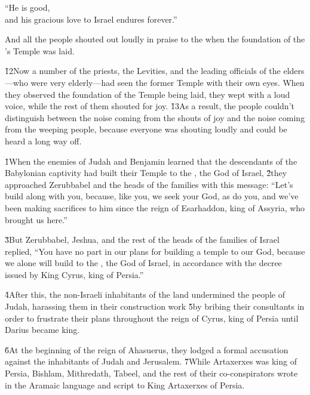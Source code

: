 \begin{poetry}
\poeml ``He is good, \\
\poemll    and his gracious love to Israel endures forever.''
\end{poetry}

And all the people shouted out loudly in praise to the  when the foundation of the 's Temple was laid.

\v{12}Now a number of the priests, the Levities, and the leading officials of the elders---who were very elderly---had seen the former Temple with their own eyes. When they observed the foundation of the Temple being laid, they wept with a loud voice, while the rest of them shouted for joy. \v{13}As a result, the people couldn't distinguish between the noise coming from the shouts of joy and the noise coming from the weeping people, because everyone was shouting loudly and could be heard a long way off.

\v{1}When the enemies of Judah and Benjamin learned that the descendants of the Babylonian captivity had built their Temple to the , the God of Israel, \v{2}they approached Zerubbabel and the heads of the families with this message: ``Let's build along with you, because, like you, we seek your God, as do you, and we've been making sacrifices to him since the reign of Esarhaddon, king of Assyria, who brought us here.''

\v{3}But Zerubbabel, Jeshua, and the rest of the heads of the families of Israel replied, ``You have no part in our plans for building a temple to our God, because we alone will build to the , the God of Israel, in accordance with the decree issued by King Cyrus, king of Persia.''

\v{4}After this, the non-Israeli inhabitants of the land undermined the people of Judah, harassing them in their construction work \v{5}by bribing their consultants in order to frustrate their plans throughout the reign of Cyrus, king of Persia until Darius became king.

\v{6}At the beginning of the reign of Ahasuerus, they lodged a formal accusation against the inhabitants of Judah and Jerusalem. \v{7}While Artaxerxes was king of Persia, Bishlam, Mithredath, Tabeel, and the rest of their co-conspirators wrote in the Aramaic language and script to King Artaxerxes of Persia.

